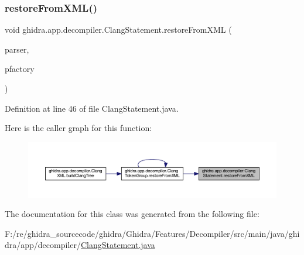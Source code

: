 \subsubsection{\texorpdfstring{restoreFromXML()}{restoreFromXML()}}
{\footnotesize\ttfamily void ghidra.\+app.\+decompiler.\+Clang\+Statement.\+restore\+From\+X\+ML (\begin{DoxyParamCaption}\item[{Xml\+Pull\+Parser}]{parser,  }\item[{Pcode\+Factory}]{pfactory }\end{DoxyParamCaption})\hspace{0.3cm}{\ttfamily [inline]}}



Definition at line 46 of file Clang\+Statement.\+java.

Here is the caller graph for this function\+:
\nopagebreak
\begin{figure}[H]
\begin{center}
\leavevmode
\includegraphics[width=350pt]{classghidra_1_1app_1_1decompiler_1_1_clang_statement_ad042eadde979f215fd60a9e3aae17cc3_icgraph}
\end{center}
\end{figure}


The documentation for this class was generated from the following file\+:\begin{DoxyCompactItemize}
\item 
F\+:/re/ghidra\+\_\+sourcecode/ghidra/\+Ghidra/\+Features/\+Decompiler/src/main/java/ghidra/app/decompiler/\mbox{\hyperlink{_clang_statement_8java}{Clang\+Statement.\+java}}\end{DoxyCompactItemize}
